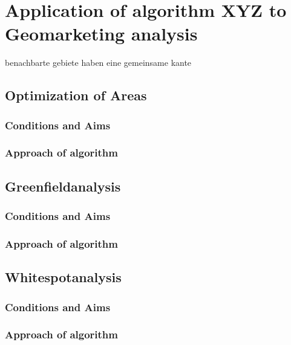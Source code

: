 \section{Application of algorithm XYZ to Geomarketing analysis}

benachbarte gebiete haben eine gemeinsame kante

\subsection{Optimization of Areas}
\subsubsection{Conditions and Aims}
\subsubsection{Approach of algorithm}

\subsection{Greenfieldanalysis}
\subsubsection{Conditions and Aims}
\subsubsection{Approach of algorithm}

\subsection{Whitespotanalysis}
\subsubsection{Conditions and Aims}
\subsubsection{Approach of algorithm}